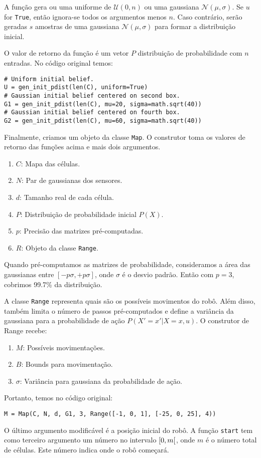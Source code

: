 \documentclass[12pt]{article}
\theoremstyle{plain}
\numberwithin{equation}{section}
\newcommand{\code}[1]{\lstinline[mathescape=true]{#1}}
\begin{document}
A função gera ou uma uniforme de $\mathcal{U}(0, n)$ ou uma gaussiana $\mathcal{N}(\mu,\sigma)$. Se
$u$ for \code{True}, então ignora-se todos os argumentos menos $n$. Caso contrário, serão geradas
$s$ amostras de uma gaussiana $\mathcal{N}(\mu,\sigma)$ para formar a distribuição inicial.

O valor de retorno da função é um vetor $P$ distribuição de probabilidade com $n$ entradas. No
código original temos:\\

\begin{lstlisting}
# Uniform initial belief.
U = gen_init_pdist(len(C), uniform=True)
# Gaussian initial belief centered on second box.
G1 = gen_init_pdist(len(C), mu=20, sigma=math.sqrt(40))
# Gaussian initial belief centered on fourth box.
G2 = gen_init_pdist(len(C), mu=60, sigma=math.sqrt(40))
\end{lstlisting}

Finalmente, criamos um objeto da classe \code{Map}. O construtor toma os valores de retorno das
funções acima e mais dois argumentos.

\begin{enumerate}
  \item $C$: Mapa das células.
  \item $N$: Par de gaussianas dos sensores.
  \item $d$: Tamanho real de cada célula.
  \item $P$: Distribuição de probabilidade inicial $P(X)$.
  \item $p$: Precisão das matrizes pré-computadas.
  \item $R$: Objeto da classe \code{Range}.
\end{enumerate}

Quando pré-computamos as matrizes de probabilidade, consideramos a área das gaussianas entre
$[-p\sigma,+p\sigma]$, onde $\sigma$ é o desvio padrão. Então com $p=3$, cobrimos 99.7\% da
distribuição.

A classe \code{Range} representa quais são os possíveis movimentos do robô. Além disso, também
limita o número de passos pré-computados e define a variância da gaussiana para a probabilidade de
ação $P(X'=x'|X=x,u)$. O construtor de Range recebe:

\begin{enumerate}
  \item $M$: Possíveis movimentações.
  \item $B$: Bounds para movimentação.
  \item $\sigma$: Variância para gaussiana da probabilidade de ação.
\end{enumerate}

Portanto, temos no código original:\\

\begin{lstlisting}
M = Map(C, N, d, G1, 3, Range([-1, 0, 1], [-25, 0, 25], 4))
\end{lstlisting}

O último argumento modificável é a posição inicial do robô. A função \code{start} tem como terceiro
argumento um número no intervalo $\interval[open right]{0}{m}$, onde $m$ é o número total de
células. Este número indica onde o robô começará.
\end{document}

